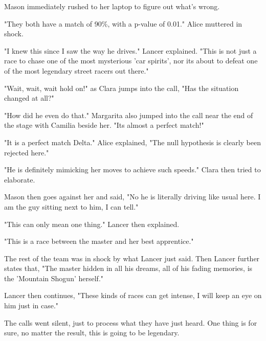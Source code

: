Mason immediately rushed to her laptop to figure out what's wrong.

"They both have a match of 90\%, with a p-value of 0.01." Alice muttered in shock.

"I knew this since I saw the way he drives." Lancer explained. "This is not just a race to chase one of the most mysterious 'car spirits', nor its about to defeat one of the most legendary street racers out there."

"Wait, wait, wait hold on!" as Clara jumps into the call, "Has the situation changed at all?"

"How did he even do that." Margarita also jumped into the call near the end of the stage with Camilia beside her. "Its almost a perfect match!"

"It is a perfect match Delta." Alice explained, "The null hypothesis is clearly been rejected here."

"He is definitely mimicking her moves to achieve such speeds." Clara then tried to elaborate.

Mason then goes against her and said, "No he is literally driving like usual here. I am the guy sitting next to him, I can tell."

"This can only mean one thing." Lancer then explained. 

\hfill

"This is a race between the master and her best apprentice."

\hfill

The rest of the team was in shock by what Lancer just said. Then Lancer further states that, "The master hidden in all his dreams, all of his fading memories, is the 'Mountain Shogun' herself."

Lancer then continues, "These kinds of races can get intense, I will keep an eye on him just in case."

The calls went silent, just to process what they have just heard. One thing is for sure, no matter the result, this is going to be legendary.
